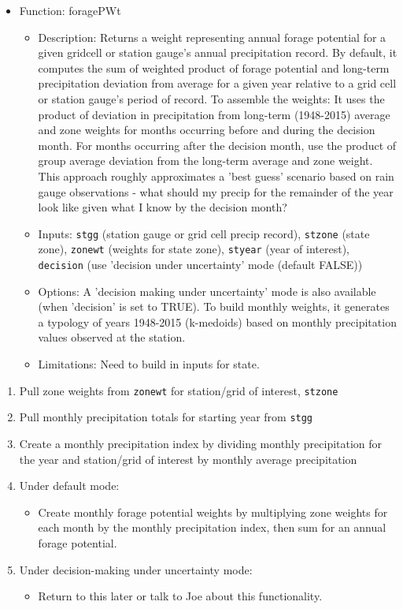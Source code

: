 \documentclass[11pt]{article}
\begin{document}
\begin{itemize}
\item Function: foragePWt
	\begin{itemize}
	\item Description: Returns a weight representing annual forage potential for a given gridcell or station gauge's annual precipitation record. By default, it	computes the sum of weighted product of forage potential and long-term precipitation deviation from average for a given year relative to a grid cell or station gauge's period of record. To assemble the weights: It uses the product of deviation in precipitation from long-term (1948-2015) average and zone weights for months occurring before and during the decision month. For months occurring after the decision month, use the product of group average deviation from the long-term average and zone weight. This approach roughly approximates a 'best guess' scenario based on rain gauge observations - what should my precip for the remainder of the year look like given what I know by the decision month?
	\item Inputs: \verb!stgg! (station gauge or grid cell precip record), \verb!stzone! (state zone), \verb!zonewt! (weights for state zone), \verb!styear! (year of interest), \verb!decision! (use 'decision under uncertainty' mode (default FALSE))
	\item Options: A 'decision making under uncertainty' mode is also available (when 'decision' is set to TRUE). To build monthly weights, it generates a typology of years 1948-2015 (k-medoids) based on monthly precipitation values observed at the station.
	\item Limitations: Need to build in inputs for state.
	\end{itemize}
\end{itemize}

\begin{enumerate}
\item Pull zone weights from \verb!zonewt! for station/grid of interest, \verb!stzone!
\item Pull monthly precipitation totals for starting year from \verb!stgg!
\item Create a monthly precipitation index by dividing monthly precipitation for the year and station/grid of interest by monthly average precipitation
\item Under default mode: 
	\begin{itemize}
	\item Create monthly forage potential weights by multiplying zone weights for each month by the monthly precipitation index, then sum for an annual forage potential.
	\end{itemize}
\item Under decision-making under uncertainty mode:
	\begin{itemize}
	\item Return to this later or talk to Joe about this functionality. 
	\end{itemize}
\end{enumerate}
\end{document}
